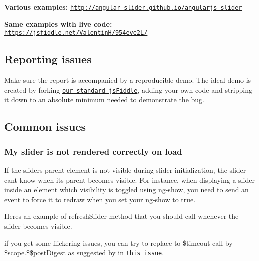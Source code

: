 \begin{DoxyItemize}
\item {\bfseries Various examples\+:} \href{http://angular-slider.github.io/angularjs-slider/index.html}{\tt http\+://angular-\/slider.\+github.\+io/angularjs-\/slider}
\item {\bfseries Same examples with live code\+:} \href{https://jsfiddle.net/ValentinH/954eve2L/}{\tt https\+://jsfiddle.\+net/\+Valentin\+H/954eve2\+L/}
\end{DoxyItemize}

\subsection*{Reporting issues}

Make sure the report is accompanied by a reproducible demo. The ideal demo is created by forking \href{http://jsfiddle.net/cwhgLcjv/}{\tt our standard js\+Fiddle}, adding your own code and stripping it down to an absolute minimum needed to demonstrate the bug.

\subsection*{Common issues}

\subsubsection*{My slider is not rendered correctly on load}

If the slider\textquotesingle{}s parent element is not visible during slider initialization, the slider can\textquotesingle{}t know when its parent becomes visible. For instance, when displaying a slider inside an element which visibility is toggled using ng-\/show, you need to send an event to force it to redraw when you set your ng-\/show to true.

Here\textquotesingle{}s an example of {\ttfamily refresh\+Slider} method that you should call whenever the slider becomes visible. 
 if you get some flickering issues, you can try to replace to {\ttfamily \$timeout} call by {\ttfamily \$scope.\$\$post\+Digest} as suggested by  in \href{https://github.com/angular-slider/angularjs-slider/issues/79#issuecomment-219213647}{\tt this issue}.

